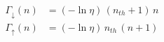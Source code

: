 \documentclass[12pt]{article}
\begin{document}
\fontsize{22}{28}\selectfont
\begin{align*}
\Gamma_\downarrow(n) &= (-\ln\eta)\,(n_{th}+1)\,n \\[0.45em]
\Gamma_\uparrow(n) &= (-\ln\eta)\,n_{th}\,(n+1)
\end{align*}
\end{document}
